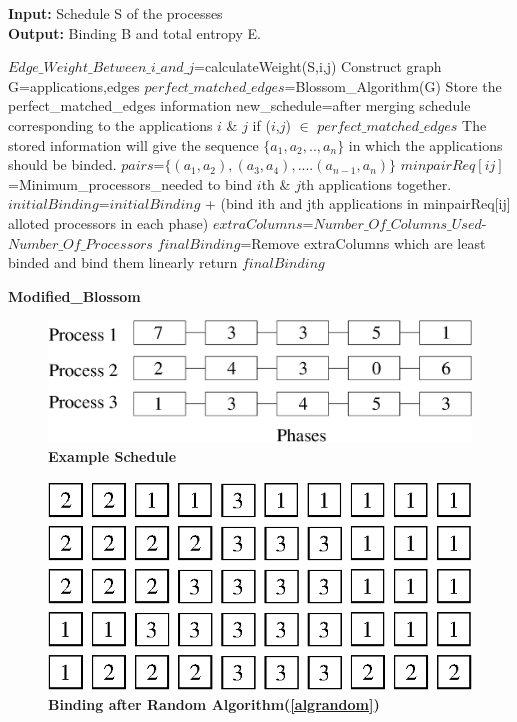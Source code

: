 \documentclass[10pt, conference]{IEEEtran}
\begin{document}
\begin{algorithm}[tb]
\footnotesize
\textbf{Input:} Schedule S of the processes  \ \\
\textbf{Output:} Binding B and total entropy E.
\begin{algorithmic}[1]
\STATE $Edge\_Weight\_Between\_i\_and\_j$=calculateWeight(S,i,j)
\ENDFOR
\STATE Construct graph G={applications,edges}
\STATE $perfect\_matched\_edges$=Blossom\_Algorithm(G)
\STATE Store the perfect\_matched\_edges information
\STATE new\_schedule=after merging schedule corresponding to the applications $i$ \& $j$ if ($i$,$j$) $\in$ $perfect\_matched\_edges$
\ENDWHILE
\STATE The stored information will give the sequence $\{a_1, a_2,.., a_{n}\}$ in which the applications should be binded.
\STATE $pairs$=$\{(a_1,a_2),(a_3,a_4),....(a_{n-1},a_{n})\}$
\STATE $minpairReq[ij]$=Minimum\_processors\_needed to bind $i$th \& $j$th applications together.
\STATE $initialBinding$=$initialBinding$ + (bind ith and jth applications in minpairReq[ij] alloted processors in each phase)
\ENDFOR
\STATE $extraColumns$=$Number\_Of\_Columns\_Used$-$Number\_Of\_Processors$
\STATE $finalBinding$=Remove extraColumns which are least binded and bind them linearly
\STATE return $finalBinding$
\end{algorithmic}
\caption{\textbf{Modified\_Blossom}}
\vspace{-0.1cm}
\label{algBlossom}
\end{algorithm}


\begin{figure} [tb]
\centering
\includegraphics[scale=0.25]{figure/schedule.eps}
\caption{\textbf{Example Schedule}}
\label{imgschd}
\end{figure}

\begin{figure} [tb]
\centering
\includegraphics[scale=0.45]{figure/random_shuffle.eps}
\caption{\textbf{Binding after Random Algorithm(\ref{algrandom}) }}
\label{imgrandom}
\end{figure}
\end{document}
